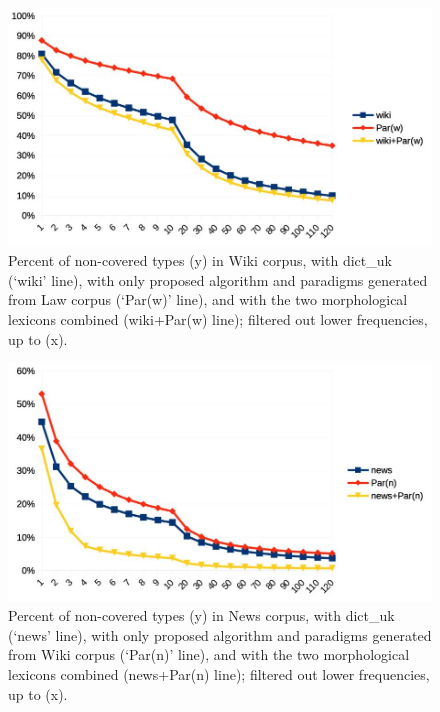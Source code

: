 \documentclass[11pt,a4paper]{article}
\begin{document}
\begin{figure}
	\includegraphics[width=\linewidth]{evaluation-coverage-wikiL.jpg}
	\caption{Percent of non-covered types (y) in Wiki corpus, with dict\_uk (`wiki' line), with only proposed algorithm and paradigms generated from Law corpus (`Par(w)' line), and with the two morphological lexicons combined (wiki+Par(w) line); filtered out lower frequencies, up to (x).}
	\label{fig:pcNoTypWikiL}
\end{figure}


\begin{figure}
	\includegraphics[width=\linewidth]{evaluation-coverage-newsW.jpg}
	\caption{Percent of non-covered types (y) in News corpus, with dict\_uk (`news' line), with only proposed algorithm and paradigms generated from Wiki corpus (`Par(n)' line), and with the two morphological lexicons combined (news+Par(n) line); filtered out lower frequencies, up to (x).}
	\label{fig:pcNoTypNewsW}
\end{figure}
\end{document}
